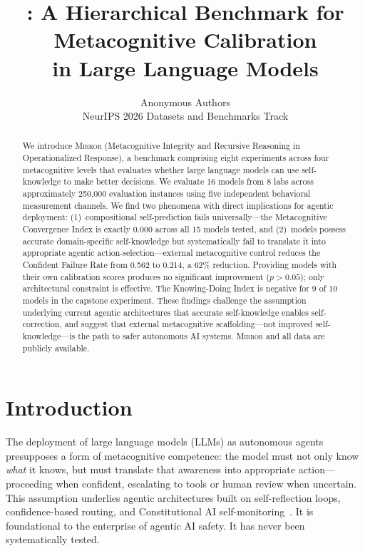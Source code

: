 \documentclass[10pt]{article}
\title{\mirror{}: A Hierarchical Benchmark for Metacognitive Calibration\\in Large Language Models}
\author{
  Anonymous Authors \\
  NeurIPS 2026 Datasets and Benchmarks Track
}
\date{}
\newcommand{\mirror}{\textsc{Mirror}}
\begin{document}
\maketitle

\begin{abstract}
We introduce \mirror{} (Metacognitive Integrity and Recursive Reasoning in
Operationalized Response), a benchmark comprising eight experiments across four
metacognitive levels that evaluates whether large language models can use
self-knowledge to make better decisions. We evaluate 16 models from 8 labs across
approximately 250,000 evaluation instances using five independent behavioral
measurement channels. We find two phenomena with direct implications for agentic
deployment: (1)~compositional self-prediction fails universally---the Metacognitive
Convergence Index is exactly 0.000 across all 15 models tested, and (2)~models
possess accurate domain-specific self-knowledge but systematically fail to translate
it into appropriate agentic action-selection---external metacognitive control reduces
the Confident Failure Rate from 0.562 to 0.214, a 62\% reduction. Providing models
with their own calibration scores produces no significant improvement ($p > 0.05$);
only architectural constraint is effective. The Knowing-Doing Index is negative for
9 of 10 models in the capstone experiment. These findings challenge the assumption
underlying current agentic architectures that accurate self-knowledge enables
self-correction, and suggest that external metacognitive scaffolding---not improved
self-knowledge---is the path to safer autonomous AI systems. \mirror{} and all data
are publicly available.
\end{abstract}

\section{Introduction}
\label{sec:intro}

The deployment of large language models (LLMs) as autonomous agents presupposes a
form of metacognitive competence: the model must not only know \textit{what} it
knows, but must translate that awareness into appropriate action---proceeding when
confident, escalating to tools or human review when uncertain. This assumption
underlies agentic architectures built on self-reflection loops, confidence-based
routing, and Constitutional AI self-monitoring~\citep{perez2022sycophancy}. It is
foundational to the enterprise of agentic AI safety. It has never been
systematically tested.
\end{document}

